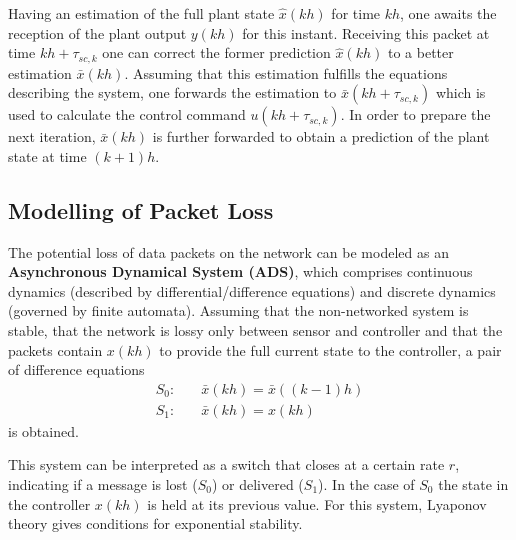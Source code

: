         Having an estimation of the full plant state $\hat{x}(kh)$ for time $kh$, one awaits the reception of the plant output $y(kh)$ for this instant. Receiving this packet at time $kh+\tau_{sc,k}$ one can correct the former prediction $\hat{x}(kh)$ to a better estimation $\bar{x}(kh)$.
        Assuming that this estimation fulfills the equations describing the system, one forwards the estimation to $\bar{x}(kh+\tau_{sc,k})$ which is used to calculate the control command $u(kh+\tau_{sc,k})$.
        In order to prepare the next iteration, $\bar{x}(kh)$ is further forwarded to obtain a prediction of the plant state at time $(k+1)h$.

    \subsection{Modelling of Packet Loss}
        The potential loss of data packets on the network can be modeled as an \textbf{Asynchronous Dynamical System (ADS)}, which comprises continuous dynamics (described by differential/difference equations) and discrete dynamics (governed by finite automata).
        Assuming that the non-networked system is stable, that the network is lossy only between sensor and controller and that the packets contain $x(kh)$ to provide the full current state to the controller, a pair of difference equations
        \begin{align*}
            S_0:&\quad \bar{x}(kh) = \bar{x}((k-1)h)\\
            S_1:&\quad  \bar{x}(kh) = x(kh)
        \end{align*}
        is obtained.

        This system can be interpreted as a switch that closes at a certain rate $r$, indicating if a message is lost ($S_0$) or delivered ($S_1$). 
        In the case of $S_0$ the state in the controller $x(kh)$ is held at its previous value.
        For this system, Lyaponov theory gives conditions for exponential stability.